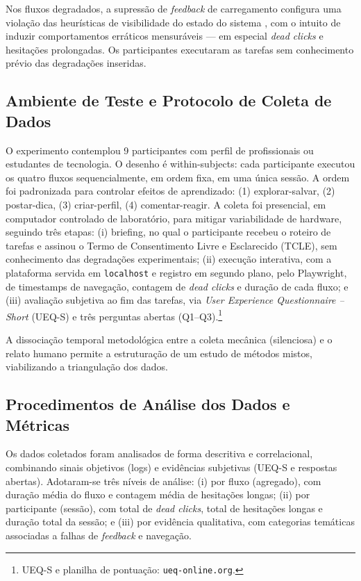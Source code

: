 \documentclass[12pt]{article}
\begin{document}
Nos fluxos degradados, a supressão de \textit{feedback} de carregamento configura uma violação das heurísticas de visibilidade do estado do sistema \cite{nielsen1994,molich1990}, com o intuito de induzir comportamentos erráticos mensuráveis --- em especial \textit{dead clicks} e hesitações prolongadas. Os participantes executaram as tarefas sem conhecimento prévio das degradações inseridas.

\subsection{Ambiente de Teste e Protocolo de Coleta de Dados}

O experimento contemplou 9 participantes com perfil de profissionais ou estudantes de tecnologia. O desenho é within-subjects: cada participante executou os quatro fluxos sequencialmente, em ordem fixa, em uma única sessão. A ordem foi padronizada para controlar efeitos de aprendizado: (1) explorar-salvar, (2) postar-dica, (3) criar-perfil, (4) comentar-reagir. A coleta foi presencial, em computador controlado de laboratório, para mitigar variabilidade de hardware, seguindo três etapas: (i) briefing, no qual o participante recebeu o roteiro de tarefas e assinou o Termo de Consentimento Livre e Esclarecido (TCLE), sem conhecimento das degradações experimentais; (ii) execução interativa, com a plataforma servida em \texttt{localhost} e registro em segundo plano, pelo Playwright, de timestamps de navegação, contagem de \textit{dead clicks} e duração de cada fluxo; e (iii) avaliação subjetiva ao fim das tarefas, via \textit{User Experience Questionnaire -- Short} (UEQ-S) e três perguntas abertas (Q1--Q3).\footnote{UEQ-S e planilha de pontuação: \texttt{ueq-online.org}.}

A dissociação temporal metodológica entre a coleta mecânica (silenciosa) e o relato humano permite a estruturação de um estudo de métodos mistos, viabilizando a triangulação dos dados.

\subsection{Procedimentos de Análise dos Dados e Métricas}\label{subsec:analise-metricas}

Os dados coletados foram analisados de forma descritiva e correlacional, combinando sinais objetivos (logs) e evidências subjetivas (UEQ-S e respostas abertas). Adotaram-se três níveis de análise: (i) por fluxo (agregado), com duração média do fluxo e contagem média de hesitações longas; (ii) por participante (sessão), com total de \textit{dead clicks}, total de hesitações longas e duração total da sessão; e (iii) por evidência qualitativa, com categorias temáticas associadas a falhas de \textit{feedback} e navegação.
\end{document}
